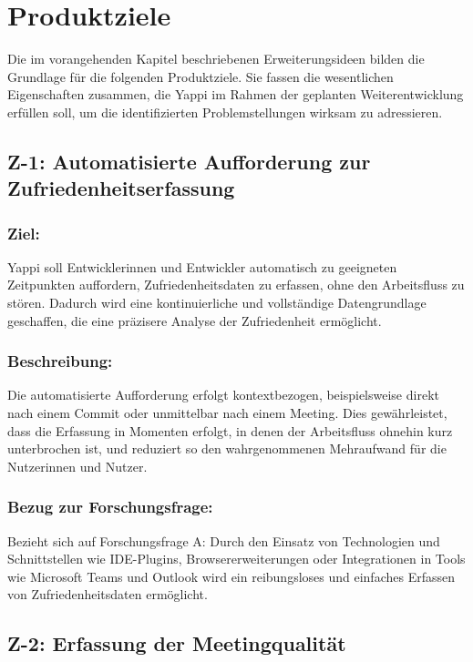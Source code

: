\documentclass[12pt,a4paper]{report}
\begin{document}
\section{Produktziele}

Die im vorangehenden Kapitel beschriebenen Erweiterungsideen bilden die Grundlage für die folgenden Produktziele. Sie fassen die
wesentlichen Eigenschaften zusammen, die Yappi im Rahmen der geplanten Weiterentwicklung erfüllen soll, um die identifizierten
Problemstellungen wirksam zu adressieren.

\subsection{Z-1: Automatisierte Aufforderung zur Zufriedenheitserfassung}

\subsubsection{Ziel:}

Yappi soll Entwicklerinnen und Entwickler automatisch zu geeigneten Zeitpunkten auffordern, Zufriedenheitsdaten zu erfassen, ohne
den Arbeitsfluss zu stören. Dadurch wird eine kontinuierliche und vollständige Datengrundlage geschaffen, die eine präzisere
Analyse der Zufriedenheit ermöglicht.

\subsubsection{Beschreibung:}

Die automatisierte Aufforderung erfolgt kontextbezogen, beispielsweise direkt nach einem Commit oder unmittelbar nach einem
Meeting. Dies gewährleistet, dass die Erfassung in Momenten erfolgt, in denen der Arbeitsfluss ohnehin kurz unterbrochen ist, und
reduziert so den wahrgenommenen Mehraufwand für die Nutzerinnen und Nutzer.

\subsubsection{Bezug zur Forschungsfrage:}

Bezieht sich auf Forschungsfrage A: Durch den Einsatz von Technologien und Schnittstellen wie IDE-Plugins, Browsererweiterungen
oder Integrationen in Tools wie Microsoft Teams und Outlook wird ein reibungsloses und einfaches Erfassen von Zufriedenheitsdaten
ermöglicht.

\subsection{Z-2: Erfassung der Meetingqualität}
\end{document}
